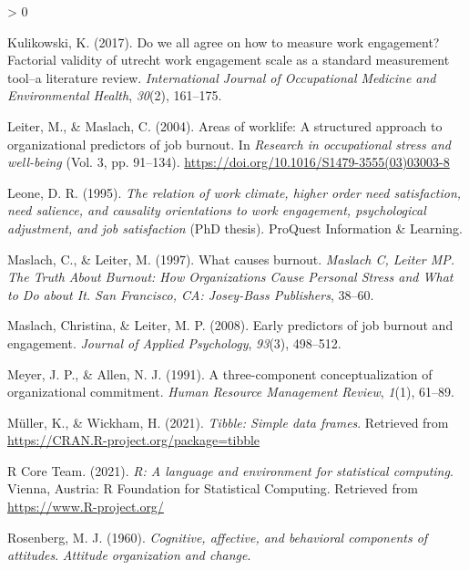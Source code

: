 \documentclass[
  english,
  man]{apa6}
\newlength{\cslhangindent}
\newenvironment{CSLReferences}[2] %
 {%
  \setlength{\parindent}{0pt}
  \ifodd #1 \everypar{\setlength{\hangindent}{\cslhangindent}}\ignorespaces\fi
  \ifnum #2 > 0
  \setlength{\parskip}{#2\baselineskip}
  \fi
 }%
 {}
\begin{document}
\begin{CSLReferences}{1}{0}
\leavevmode\hypertarget{ref-kulikowski2017we}{}%
Kulikowski, K. (2017). Do we all agree on how to measure work engagement? Factorial validity of utrecht work engagement scale as a standard measurement tool--a literature review. \emph{International Journal of Occupational Medicine and Environmental Health}, \emph{30}(2), 161--175.

\leavevmode\hypertarget{ref-leiter_areas_2004}{}%
Leiter, M., \& Maslach, C. (2004). Areas of worklife: A structured approach to organizational predictors of job burnout. In \emph{Research in occupational stress and well-being} (Vol. 3, pp. 91--134). \url{https://doi.org/10.1016/S1479-3555(03)03003-8}

\leavevmode\hypertarget{ref-leone_relation_1995}{}%
Leone, D. R. (1995). \emph{The relation of work climate, higher order need satisfaction, need salience, and causality orientations to work engagement, psychological adjustment, and job satisfaction} (PhD thesis). ProQuest Information \& Learning.

\leavevmode\hypertarget{ref-maslach1997causes}{}%
Maslach, C., \& Leiter, M. (1997). What causes burnout. \emph{Maslach C, Leiter MP. The Truth About Burnout: How Organizations Cause Personal Stress and What to Do about It. San Francisco, CA: Josey-Bass Publishers}, 38--60.

\leavevmode\hypertarget{ref-maslach_early_2008}{}%
Maslach, Christina, \& Leiter, M. P. (2008). Early predictors of job burnout and engagement. \emph{Journal of Applied Psychology}, \emph{93}(3), 498--512.

\leavevmode\hypertarget{ref-meyer_three-component_1991}{}%
Meyer, J. P., \& Allen, N. J. (1991). A three-component conceptualization of organizational commitment. \emph{Human Resource Management Review}, \emph{1}(1), 61--89.

\leavevmode\hypertarget{ref-R-tibble}{}%
Müller, K., \& Wickham, H. (2021). \emph{Tibble: Simple data frames}. Retrieved from \url{https://CRAN.R-project.org/package=tibble}

\leavevmode\hypertarget{ref-R-base}{}%
R Core Team. (2021). \emph{R: A language and environment for statistical computing}. Vienna, Austria: R Foundation for Statistical Computing. Retrieved from \url{https://www.R-project.org/}

\leavevmode\hypertarget{ref-rosenberg_cognitive_1960}{}%
Rosenberg, M. J. (1960). \emph{Cognitive, affective, and behavioral components of attitudes}. \emph{Attitude organization and change}.


\end{CSLReferences}
\end{document}
